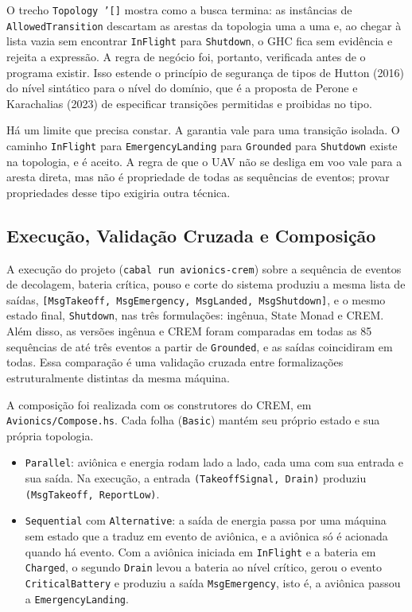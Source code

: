 \documentclass[12pt,a4paper]{article}
\begin{document}
O trecho \texttt{Topology '[]} mostra como a busca termina: as instâncias de \texttt{AllowedTransition} descartam as arestas da topologia uma a uma e, ao chegar à lista vazia sem encontrar \texttt{InFlight} para \texttt{Shutdown}, o GHC fica sem evidência e rejeita a expressão. A regra de negócio foi, portanto, verificada antes de o programa existir. Isso estende o princípio de segurança de tipos de Hutton (2016) do nível sintático para o nível do domínio, que é a proposta de Perone e Karachalias (2023) de especificar transições permitidas e proibidas no tipo.

Há um limite que precisa constar. A garantia vale para uma transição isolada. O caminho \texttt{InFlight} para \texttt{EmergencyLanding} para \texttt{Grounded} para \texttt{Shutdown} existe na topologia, e é aceito. A regra de que o UAV não se desliga em voo vale para a aresta direta, mas não é propriedade de todas as sequências de eventos; provar propriedades desse tipo exigiria outra técnica.

\subsection{Execução, Validação Cruzada e Composição}

A execução do projeto (\texttt{cabal run avionics-crem}) sobre a sequência de eventos de decolagem, bateria crítica, pouso e corte do sistema produziu a mesma lista de saídas, \texttt{[MsgTakeoff, MsgEmergency, MsgLanded, MsgShutdown]}, e o mesmo estado final, \texttt{Shutdown}, nas três formulações: ingênua, State Monad e CREM. Além disso, as versões ingênua e CREM foram comparadas em todas as 85 sequências de até três eventos a partir de \texttt{Grounded}, e as saídas coincidiram em todas. Essa comparação é uma validação cruzada entre formalizações estruturalmente distintas da mesma máquina.

A composição foi realizada com os construtores do CREM, em \texttt{Avionics/Compose.hs}. Cada folha (\texttt{Basic}) mantém seu próprio estado e sua própria topologia.

\begin{itemize}
\item \texttt{Parallel}: aviônica e energia rodam lado a lado, cada uma com sua entrada e sua saída. Na execução, a entrada \texttt{(TakeoffSignal, Drain)} produziu \texttt{(MsgTakeoff, ReportLow)}.
\item \texttt{Sequential} com \texttt{Alternative}: a saída de energia passa por uma máquina sem estado que a traduz em evento de aviônica, e a aviônica só é acionada quando há evento. Com a aviônica iniciada em \texttt{InFlight} e a bateria em \texttt{Charged}, o segundo \texttt{Drain} levou a bateria ao nível crítico, gerou o evento \texttt{CriticalBattery} e produziu a saída \texttt{MsgEmergency}, isto é, a aviônica passou a \texttt{EmergencyLanding}.
\end{itemize}
\end{document}
